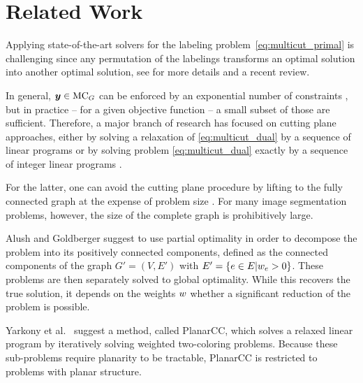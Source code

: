 \section{Related Work\label{sec:gcg_related_work}}
Applying state-of-the-art solvers for the labeling
problem~\eqref{eq:multicut_primal} is challenging since any permutation of
the labelings transforms an optimal solution into another optimal solution,
see \cite{kappes_2013_arxiv} for more details and a recent review.


In general,
$\boldsymbol y \in \text{MC}_G$ can be enforced by an exponential number of
constraints \cite{chopra_1993_mp}, but in practice
-- for a given objective function --
a small subset of those are sufficient.
Therefore, a major branch of research has focused 
on cutting plane approaches,
either by solving a relaxation of \eqref{eq:multicut_dual}
by a sequence of linear programs 
\cite{kim_2011_nips,kim_2012_ip,kappes_2013_arxiv,finley_2005_ml} 
or
by solving problem \eqref{eq:multicut_dual} exactly by a sequence
of integer linear programs
\cite{kappes_2011_emmcvpr,andres_2011_iccv,kroeger_2012_eccv,kappes_2013_arxiv,alush_2012_pami,alush_2013_simbad}.

For the latter, one can avoid the cutting plane procedure by lifting to the
fully connected graph at the expense of problem size \cite{alush_2012_pami}.
For many image segmentation problems, however, the size of the complete graph is
prohibitively large.

Alush and Goldberger \cite{alush_2012_pami,alush_2013_simbad} suggest to use
partial optimality in order to decompose the
problem into its positively connected components,
defined as the connected components of the graph $G'=(V,E')$ with
$E'=\{e\in E | w_e > 0 \}$.
These problems are then separately solved to global optimality.
While this recovers the true solution, it depends on
the weights $w$ whether 
a significant reduction of the problem is possible.

Yarkony et al.~\cite{yarkony_2012_eccv} suggest a method,
called PlanarCC,
which solves a relaxed linear program by
iteratively solving weighted two-coloring problems.
Because these sub-problems require planarity to be tractable,
PlanarCC is restricted to problems with planar structure.

